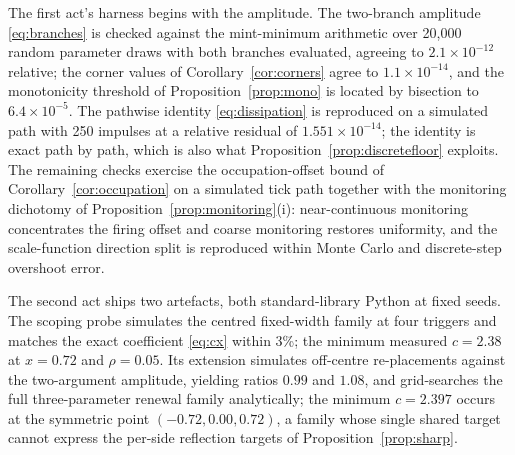 \documentclass[11pt,a4paper]{article}
\theoremstyle{definition}
\theoremstyle{plain}
\theoremstyle{remark}
\begin{document}
The first act's harness begins with the amplitude. The two-branch amplitude \eqref{eq:branches} is checked against the mint-minimum arithmetic over 20{,}000 random parameter draws with 
both branches evaluated, agreeing to $2.1 \times 10^{-12}$ relative; the corner values of Corollary~\ref{cor:corners} agree to $1.1 \times 10^{-14}$, and the monotonicity threshold of 
Proposition~\ref{prop:mono} is located by bisection to $6.4 \times 10^{-5}$. The pathwise identity \eqref{eq:dissipation} is reproduced on a simulated path with 250 impulses at a 
relative residual of $1.551 \times 10^{-14}$; the identity is exact path by path, which is also what Proposition~\ref{prop:discretefloor} exploits. The remaining checks exercise the 
occupation-offset bound of Corollary~\ref{cor:occupation} on a simulated tick path together with the monitoring dichotomy of Proposition~\ref{prop:monitoring}(i): near-continuous 
monitoring concentrates the firing offset and coarse monitoring restores uniformity, and the scale-function direction split is reproduced within Monte Carlo and discrete-step overshoot error.

The second act ships two artefacts, both standard-library Python at fixed seeds. The scoping probe simulates the centred fixed-width family at four triggers and matches the exact coefficient 
\eqref{eq:cx} within 3\%; the minimum measured $c = 2.38$ at $x = 0.72$ and $\rho = 0.05$. Its extension simulates off-centre re-placements against the two-argument amplitude, yielding 
ratios $0.99$ and $1.08$, and grid-searches the full three-parameter renewal family analytically; the minimum $c = 2.397$ occurs at the symmetric point $(-0.72, 0.00, 0.72)$, a family 
whose single shared target cannot express the per-side reflection targets of Proposition~\ref{prop:sharp}.
\end{document}
